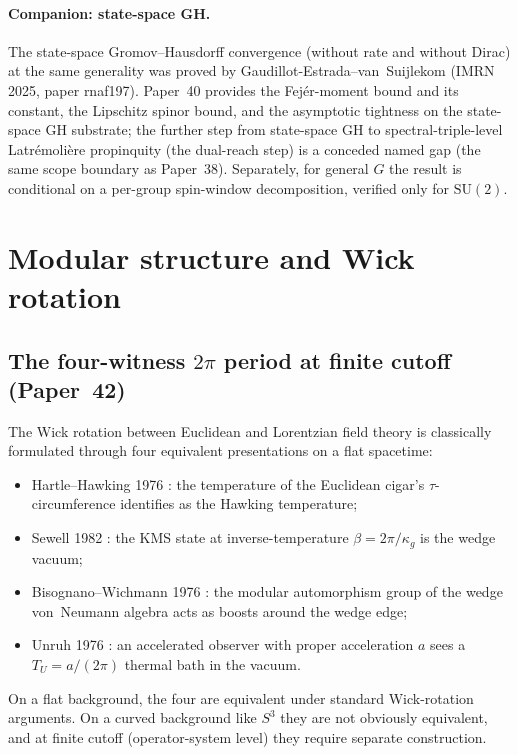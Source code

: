 \documentclass[11pt,a4paper]{article}
\theoremstyle{plain}
\theoremstyle{definition}
\newcommand{\sthree}{S^{3}}
\newcommand{\SU}{\mathrm{SU}}
\begin{document}
\paragraph{Companion: state-space GH.}
The state-space Gromov--Hausdorff convergence (without rate and
without Dirac) at the same generality was proved by
Gaudillot-Estrada--van~Suijlekom (IMRN 2025, paper rnaf197).
Paper~40 provides the Fej\'er-moment bound and its constant, the Lipschitz spinor
bound, and the asymptotic tightness on the state-space GH substrate;
the further step from state-space GH to spectral-triple-level
Latr\'emoli\`ere propinquity (the dual-reach step) is a conceded named
gap (the same scope boundary as Paper~38).  Separately, for general $G$
the result is conditional on a per-group spin-window decomposition,
verified only for $\SU(2)$.

\section{Modular structure and Wick rotation}
\label{sec:modular}

\subsection{The four-witness $2\pi$ period at finite cutoff (Paper~42)}

The Wick rotation between Euclidean and Lorentzian field theory is
classically formulated through four equivalent presentations on a
flat spacetime:
\begin{itemize}\setlength\itemsep{0pt}
\item Hartle--Hawking 1976 \cite{hartle_hawking1976}:
the temperature of the Euclidean cigar's $\tau$-circumference
identifies as the Hawking temperature;
\item Sewell 1982 \cite{sewell1982}:
the KMS state at inverse-temperature $\beta = 2\pi/\kappa_{g}$ is the
wedge vacuum;
\item Bisognano--Wichmann 1976 \cite{bisognano_wichmann1976}:
the modular automorphism group of the wedge von~Neumann algebra
acts as boosts around the wedge edge;
\item Unruh 1976 \cite{unruh1976}:
an accelerated observer with proper acceleration $a$ sees a
$T_{U} = a/(2\pi)$ thermal bath in the vacuum.
\end{itemize}
On a flat background, the four are equivalent under standard
Wick-rotation arguments.  On a curved background like $\sthree$ they
are not obviously equivalent, and at finite cutoff (operator-system
level) they require separate construction.
\end{document}
